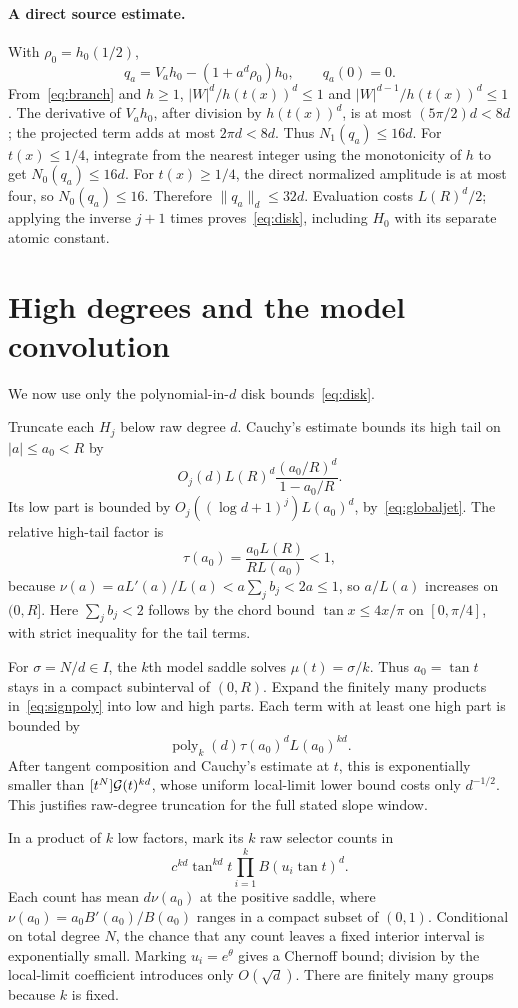 \documentclass[11pt,a4paper]{article}
\theoremstyle{remark}\newtheorem*{ednote}{Editorial note (ProveIt, 2026-10-01)}
\begin{document}
\paragraph{A direct source estimate.}
With $\rho_0=h_0(1/2)$,
\[
 q_a=V_ah_0-(1+a^d\rho_0)h_0,\qquad q_a(0)=0.
\]
From~\eqref{eq:branch} and $h\ge1$,
$|W|^d/h(t(x))^d\le1$ and $|W|^{d-1}/h(t(x))^d\le1$.
The derivative of $V_ah_0$, after division by $h(t(x))^d$, is at most $(5\pi/2)d<8d$; the projected term adds at most $2\pi d<8d$. Thus $N_1(q_a)\le16d$.
For $t(x)\le1/4$, integrate from the nearest integer using the monotonicity of $h$ to get $N_0(q_a)\le16d$. For $t(x)\ge1/4$, the direct normalized amplitude is at most four, so $N_0(q_a)\le16$. Therefore $\|q_a\|_d\le32d$.
Evaluation costs $L(R)^d/2$; applying the inverse $j+1$ times proves~\eqref{eq:disk}, including $H_0$ with its separate atomic constant.

\section{High degrees and the model convolution}
We now use only the polynomial-in-$d$ disk bounds~\eqref{eq:disk}.

Truncate each $H_j$ below raw degree $d$. Cauchy's estimate bounds its high tail on $|a|\le a_0<R$ by
\[
 O_j(d)L(R)^d\frac{(a_0/R)^d}{1-a_0/R}.
\]
Its low part is bounded by $O_j((\log d+1)^j)L(a_0)^d$, by~\eqref{eq:globaljet}. The relative high-tail factor is
\[
 \tau(a_0)=\frac{a_0L(R)}{RL(a_0)}<1,
\]
because $\nu(a)=aL'(a)/L(a)<a\sum_jb_j<2a\le1$, so $a/L(a)$ increases on $(0,R]$. Here $\sum_jb_j<2$ follows by the chord bound $\tan x\le4x/\pi$ on $[0,\pi/4]$, with strict inequality for the tail terms.

For $\sigma=N/d\in I$, the $k$th model saddle solves $\mu(t)=\sigma/k$. Thus $a_0=\tan t$ stays in a compact subinterval of $(0,R)$. Expand the finitely many products in~\eqref{eq:signpoly} into low and high parts. Each term with at least one high part is bounded by
\[
 \operatorname{poly}_k(d)\tau(a_0)^d L(a_0)^{kd}.
\]
After tangent composition and Cauchy's estimate at $t$, this is exponentially smaller than $[t^N]\mathcal G(t)^{kd}$, whose uniform local-limit lower bound costs only $d^{-1/2}$. This justifies raw-degree truncation for the full stated slope window.

In a product of $k$ low factors, mark its $k$ raw selector counts in
\[
 c^{kd}\tan^{kd}t\prod_{i=1}^k B(u_i\tan t)^d.
\]
Each count has mean $d\nu(a_0)$ at the positive saddle, where
$\nu(a_0)=a_0B'(a_0)/B(a_0)$ ranges in a compact subset of $(0,1)$. Conditional on total degree $N$, the chance that any count leaves a fixed interior interval is exponentially small. Marking $u_i=e^\theta$ gives a Chernoff bound; division by the local-limit coefficient introduces only $O(\sqrt d)$. There are finitely many groups because $k$ is fixed.
\end{document}
